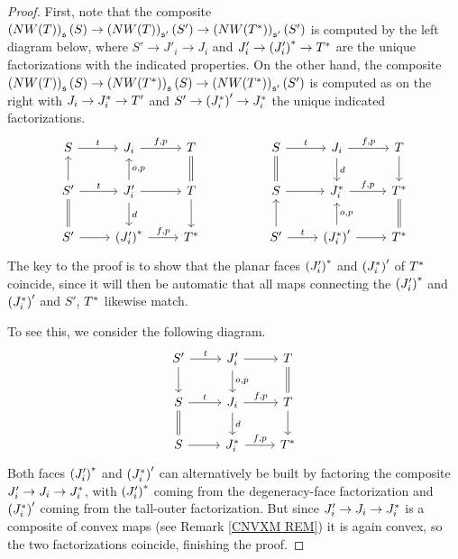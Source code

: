 \documentclass[a4paper,10pt
,draft
]{article}%
\numberwithin{equation}{section}
\numberwithin{figure}{section}
\theoremstyle{definition} %
\newcommand{\1}{\ensuremath{\mathbbm 1}}%
\begin{document}
\begin{proof}
	First, note that the composite
	$\left(NW(T)\right)_{\mathfrak{s}}({S})
	\to 
	\left(NW(T)\right)_{\mathfrak{s}'}({S'})
	\to 
	\left(NW(T^{\**})\right)_{\mathfrak{s}'}({S'})$
	is computed by the left diagram below,
	where
	$S' \to J'_i \to J_i$
	and 
	$J'_i \to \left(J_i'\right)^{\**} \to T^{\**}$
	are the unique factorizations with the indicated properties.
	On the other hand, the composite
	$\left(NW(T)\right)_{\mathfrak{s}}(S)
	\to 
	\left(NW(T^{\**})\right)_{\mathfrak{s}}(S)
	\to 
	\left(NW(T^{\**})\right)_{\mathfrak{s}'}(S')$
	is computed as on the right
	with 
	$J_i \to J^{\**}_i \to T'$ and
	$S' \to \left(J_i^{\**}\right)' \to J^{\**}_i$
	the unique indicated factorizations.
\begin{equation}
\begin{tikzcd}
	S \ar{r}{t} 
&
	J_i \ar{r}{f,p} 
&
	T \ar[equal]{d}
&&%
	S \ar{r}{t} \ar[equal]{d}
&
	J_i \ar{r}{f,p} \ar{d}{d}
&
	T \ar{d}
\\
	S' \ar{u} \ar{r}{t} \ar[equal]{d}
&
	J'_i \ar{r} \arrow{u}[swap]{o,p} \arrow{d}{d}
&
	T \ar{d}
&&%
	S \ar{r}
&
	J^{\**}_i \arrow{r}{f,p}
&
	T^{\**} \ar[equal]{d}
\\
	S' \ar{r}
&
	\left(J_i'\right)^{\**} \arrow{r}{f,p}
&
	T^{\**}
&&%
	S' \arrow{r}{t} \ar{u}
&
	\left(J_i^{\**}\right)' \ar{r} \arrow{u}[swap]{o,p}
&
	T^{\**}
\end{tikzcd}
\end{equation}
	The key to the proof is to show
	that the planar faces 
	$\left(J_i'\right)^{\**}$ and
	$\left(J_i^{\**}\right)'$
	of $T^{\**}$
	coincide, since it will then be automatic that all maps connecting the
	$\left(J_i'\right)^{\**}$ and
	$\left(J_i^{\**}\right)'$
	and $S'$, $T^{\**}$
	likewise match.

	To see this, we consider the following diagram.
\begin{equation}
\begin{tikzcd}
	S' \ar{r}{t} \ar{d}
&
	J'_i \ar{r} \ar{d}{o,p}
&
	T \ar[equal]{d}
\\
	S  \ar{r}{t} \ar[equal]{d}
&
	J_i \ar{r}{f,p}  \ar{d}{d}
&
	T \ar{d}
\\
	S \ar{r}
&
	J_i^{\**} \ar{r}{f,p}
&
	T^{\**}
\end{tikzcd}
\end{equation}
	Both faces  
	$\left(J'_i\right)^{\**}$ and 
	$\left(J^{\**}_i\right)'
	$
	can alternatively be built by factoring
	the composite 
	$J'_i \to J_i \to J_i^{\**}$,
	with 
	$\left(J'_i\right)^{\**}$ 
	coming from the 
	degeneracy-face factorization
	and 
	$\left(J^{\**}_i\right)'$
	coming from the 
	tall-outer factorization.
	But since 
	$J'_i \to J_i \to J_i^{\**}$
	is a composite of convex maps 
	(see Remark \ref{CNVXM REM})
	it is again convex, 
	so the two factorizations coincide, 
	finishing the proof.
\end{proof}
\end{document}
